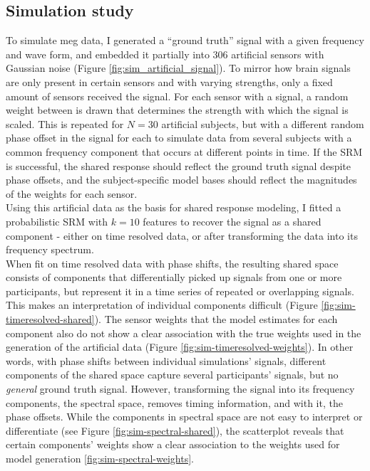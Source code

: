 \subsection{Simulation study}


To simulate \gls{meg} data, I generated a ``ground truth'' signal with a given frequency and wave form, and embedded it partially into 306 artificial sensors with Gaussian noise (Figure \ref{fig:sim_artificial_signal}).
To mirror how brain signals are only present in certain sensors and with varying strengths, only a fixed amount of sensors received the signal.
For each sensor with a signal, a random weight between is drawn that determines the strength with which the signal is scaled.
This is repeated for $N = 30$ artificial subjects, but with a different random phase offset in the signal for each to simulate data from several subjects with a common frequency component that occurs at different points in time.
If the \gls{SRM} is successful, the shared response should reflect the ground truth signal despite phase offsets, and the subject-specific model bases should reflect the magnitudes of the weights for each sensor.\\
Using this artificial data as the basis for shared response modeling, I fitted a probabilistic \gls{SRM} with $k=10$ features to recover the signal as a shared component - either on time resolved data, or after transforming the data into its frequency spectrum.\\
When fit on time resolved data with phase shifts, the resulting shared space consists of components that differentially picked up signals from one or more participants, but represent it in a time series of repeated or overlapping signals.
This makes an interpretation of individual components difficult (Figure \ref{fig:sim-timeresolved-shared}).
The sensor weights that the model estimates for each component also do not show a clear association with the true weights used in the generation of the artificial data (Figure \ref{fig:sim-timeresolved-weights}).
In other words, with phase shifts between individual simulations' signals, different components of the shared space capture several participants' signals, but no \textit{general} ground truth signal.
However, transforming the signal into its frequency components, the spectral space, removes timing information, and with it, the phase offsets.
While the components in spectral space are not easy to interpret or differentiate (see Figure \ref{fig:sim-spectral-shared}), the scatterplot reveals that certain components' weights show a clear association to the weights used for model generation \ref{fig:sim-spectral-weights}.
